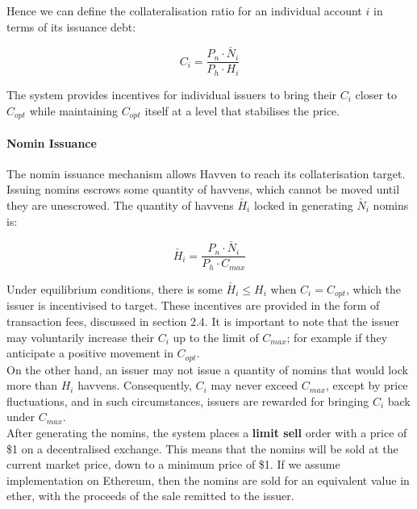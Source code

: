 \noindent Hence we can define the collateralisation ratio for an individual account $i$ in terms of its issuance debt:

\begin{equation}
C_i = \frac{P_n \cdot \check{N_i}}{P_h \cdot H_i}  \label{eq:individualcollat}
\end{equation}

\vspace{3 mm}

\noindent The system provides incentives for individual issuers to bring their $C_i$ closer to $C_{opt}$ while maintaining $C_{opt}$ itself at a level that stabilises the price.

\paragraph{Nomin Issuance}

\noindent The nomin issuance mechanism allows Havven to reach its collaterisation target.
Issuing nomins escrows some quantity of havvens, which cannot be moved until they are unescrowed.
The quantity of havvens $\check{H_i}$ locked in generating $\check{N_i}$ nomins is:

\begin{equation}
\check{H_i} = \frac{P_n \cdot \check{N_i}}{P_h \cdot C_{max}}  \label{eq:escrowed}
\end{equation}

\vspace{3 mm}

\noindent Under equilibrium conditions, there is some $\check{H_i} \leq H_i$
when $C_i = C_{opt}$, which the issuer is incentivised to target.
These incentives are provided in the form of transaction fees,
discussed in section 2.4. It is important to note that the issuer may
voluntarily increase their $C_i$ up to the limit of $C_{max}$; for example if
they anticipate a positive movement in $C_{opt}$. \\

\noindent On the other hand, an issuer may not issue a quantity of nomins
that would lock more than $H_i$ havvens. 
Consequently, $C_i$ may never exceed $C_{max}$, except by price fluctuations,
and in such circumstances, issuers are rewarded for bringing $C_i$ back under $C_{max}$. \\

\noindent After generating the nomins, the system places a \textbf{limit sell} order with a price of \$1 on a decentralised exchange. This means that the nomins will be sold at the current market price, down to a minimum price of \$1. If we assume implementation on Ethereum, then the nomins are sold for an equivalent value in ether, with the proceeds of the sale remitted to the issuer.

